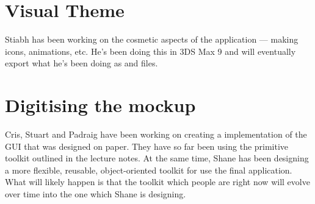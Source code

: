 \documentclass[titlepage,a4paper]{article}
\begin{document}
\section{Visual Theme}
Stiabh has been working on the cosmetic aspects of the application ---
making icons, animations, etc. He's been doing this in 3DS Max 9 and will
eventually export what he's been doing as  and  files.

\section{Digitising the mockup}
Cris, Stuart and Padraig have been working on creating a 
implementation of the GUI that was designed on paper. They have so far been
using the primitive  toolkit outlined in the lecture notes.
At the same time, Shane has been designing a more flexible, reusable,
object-oriented toolkit for use the final application. What will likely happen
is that the toolkit which people are right now will evolve over time into the
one which Shane is designing.
\end{document}
